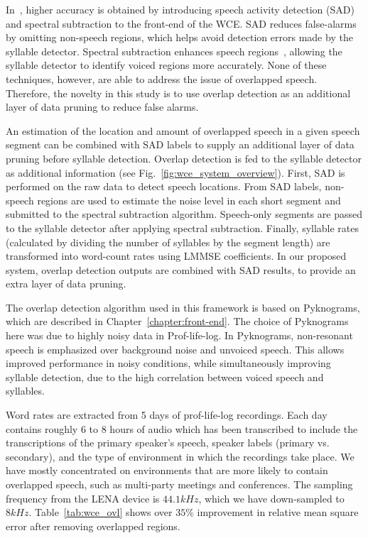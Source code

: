 In~\cite{IS14_wce}, higher accuracy is obtained by introducing speech activity detection (SAD)~\cite{sadjadi2013unsupervised} and spectral subtraction to the front-end of the WCE. 
SAD reduces false-alarms by omitting non-speech regions, which helps avoid detection errors made by the syllable detector. 
Spectral subtraction enhances speech regions~\cite{boll1979spectralSubtraction}, allowing the syllable detector to identify voiced regions more accurately. 
None of these techniques, however, are able to address the issue of overlapped speech. 
Therefore, the novelty in this study is to use overlap detection as an additional layer of data pruning to reduce false alarms. 

An estimation of the location and amount of overlapped speech in a given speech segment can be combined with SAD labels to supply an additional layer of data pruning before syllable detection. 
Overlap detection is fed to the syllable detector as additional information (see Fig.~\ref{fig:wce_system_overview}).  
First, SAD is performed on the raw data to detect speech locations. 
From SAD labels, non-speech regions are used to estimate the noise level in each short segment and submitted to the spectral subtraction algorithm. 
Speech-only segments are passed to the syllable detector after applying spectral subtraction. 
Finally, syllable rates (calculated by dividing the number of syllables by the segment length) are transformed into word-count rates using LMMSE coefficients. 
In our proposed system, overlap detection outputs are combined with SAD results, to provide an extra layer of data pruning. 

The overlap detection algorithm used in this framework is based on Pyknograms, which are described in Chapter~\ref{chapter:front-end}. 
The choice of Pyknograms here was due to highly noisy data in Prof-life-log. 
In Pyknograms, non-resonant speech is emphasized over background noise and unvoiced speech. 
This allows improved performance in noisy conditions, while simultaneously improving syllable detection, due to the high correlation between voiced speech and syllables. 

Word rates are extracted from 5 days of prof-life-log recordings. 
Each day contains roughly 6 to 8 hours of audio which has been transcribed to include the transcriptions of the primary speaker's speech, speaker labels (primary vs. secondary), and the type of environment in which the recordings take place. 
We have mostly concentrated on environments that are more likely to contain overlapped speech, such as multi-party meetings and conferences.
The sampling frequency from the LENA device is $44.1kHz$, which we have down-sampled to $8kHz$. Table~\ref{tab:wce_ovl} shows over $35\%$ improvement in relative mean square error after removing overlapped regions. 

